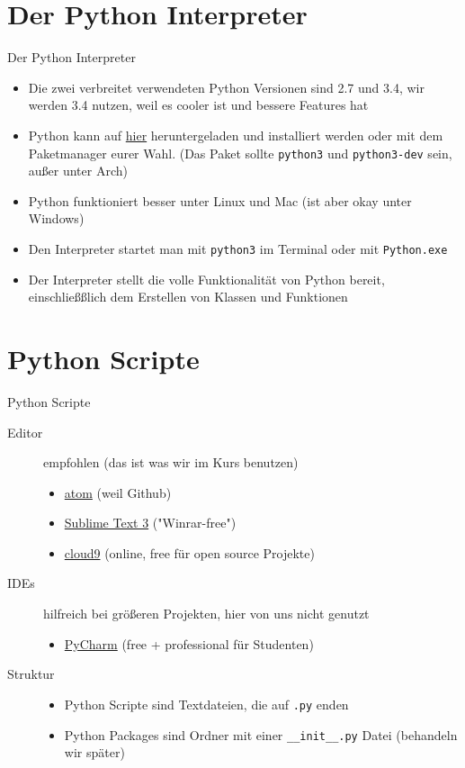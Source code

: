 \section{Der Python Interpreter}
\begin{frame}{Der Python Interpreter}
	\begin{itemize}
    	\item Die zwei verbreitet verwendeten Python Versionen sind 2.7 und 3.4, wir werden 3.4 nutzen, weil es cooler ist und bessere Features hat
		\item Python kann auf \href{http://www.python.org}{hier} heruntergeladen und installiert werden oder mit dem Paketmanager eurer Wahl. (Das Paket sollte \texttt{python3} und \texttt{python3-dev} sein, außer unter Arch)
    	\item Python funktioniert besser unter Linux und Mac (ist aber okay unter Windows)
    	\item Den Interpreter startet man mit \texttt{python3} im Terminal oder mit \texttt{Python.exe}
    	\item Der Interpreter stellt die volle Funktionalität von Python bereit, einschließßlich dem Erstellen von Klassen und Funktionen
	\end{itemize}
\end{frame}

\section{Python Scripte}
\begin{frame}{Python Scripte}
\begin{description}
   	\item[Editor] empfohlen (das ist was wir im Kurs benutzen)
    \begin{itemize}
        \item \href{https://atom.io}{atom} (weil Github)
        \item \href{http://www.sublimetext.com/3}{Sublime Text 3} ("Winrar-free")
        \item \href{https://c9.i}{cloud9} (online, free für open source Projekte)
    \end{itemize}
    \item[IDEs] hilfreich bei grö\ss{}eren Projekten, hier von uns nicht genutzt 
    \begin{itemize}
       	\item \href{https://jetbrains.com/pycharm}{PyCharm} (free + professional für Studenten)
   	\end{itemize}
   	\item[Struktur]
   	\begin{itemize}
       	\item Python Scripte sind Textdateien, die auf \texttt{.py} enden
        \item Python Packages sind Ordner mit einer \texttt{\_\_init\_\_.py} Datei (behandeln wir später)
    \end{itemize}
\end{description}
\end{frame}


